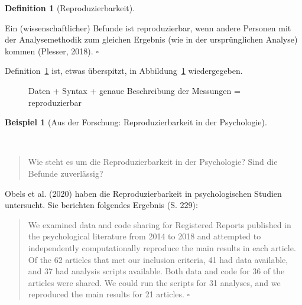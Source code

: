 \documentclass[
  letterpaper,
  twoside,
  open=any]{scrbook}
\theoremstyle{definition}
\newtheorem{definition}{Definition}[chapter]
\theoremstyle{definition}
\theoremstyle{definition}
\newtheorem{example}{Beispiel}[chapter]
\theoremstyle{remark}
\begin{document}
\begin{definition}[Reproduzierbarkeit]\protect\hypertarget{def-repro}{}\label{def-repro}

Ein (wissenschaftlicher) Befunde ist reproduzierbar, wenn andere
Personen mit der Analysemethodik zum gleichen Ergebnis (wie in der
ursprünglichen Analyse) kommen (Plesser, 2018). \(\square\)

\end{definition}

Definition~\ref{def-repro} ist, etwas überspitzt, in
Abbildung~\ref{fig-repro} wiedergegeben.

\begin{figure}


\caption{\label{fig-repro}Daten + Syntax + genaue Beschreibung der
Messungen = reproduzierbar}

\end{figure}%

\begin{example}[Aus der Forschung: Reproduzierbarkeit in der
Psychologie]\protect\hypertarget{exm-repro}{}\label{exm-repro}

~

\begin{quote}
{} Wie steht es um die Reproduzierbarkeit in der
Psychologie? Sind die Befunde zuverlässig?
\end{quote}

Obels et al. (2020) haben die Reproduzierbarkeit in psychologischen
Studien untersucht. Sie berichten folgendes Ergebnis (S. 229):

\begin{quote}
We examined data and code sharing for Registered Reports published in
the psychological literature from 2014 to 2018 and attempted to
independently computationally reproduce the main results in each
article. Of the 62 articles that met our inclusion criteria, 41 had data
available, and 37 had analysis scripts available. Both data and code for
36 of the articles were shared. We could run the scripts for 31
analyses, and we reproduced the main results for 21 articles.
\(\square\)
\end{quote}

\end{example}
\end{document}
